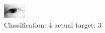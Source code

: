 \begin{figure}[h!]
\begin{center}
\includegraphics[width=0.60\columnwidth]{figures/ID174_class_4_target_3.png}
\end{center}
\caption{ Classification: 4 actual target: 3}
\label{fig:ID174_class_4_target_3}
\end{figure}
